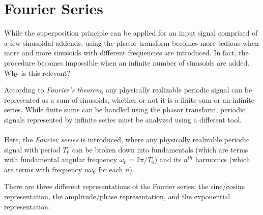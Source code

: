 \documentclass{report}
\begin{document}
\section{Fourier Series}
While the superposition principle can be applied for an input signal comprised of a few sinusoidal addends, using the phasor transform becomes more tedious when more and more sinusoids with different frequencies are introduced. 
In fact, the procedure becomes impossible when an infinite number of sinusoids are added. Why is this relevant?
\begin{tcolorbox}[width=\textwidth,colback={white}, sharp corners]
    According to \emph{Fourier's theorem}, any physically realizable periodic signal can be represented as a sum of sinusoids, whether or not it is a finite sum or an infinite series. While finite sums can be handled using the phasor transform, periodic signals represented by 
    infinite series must be analyzed using a different tool. 
    \\ \\ 
    Here, the \emph{Fourier series} is introduced, where any physically realizable periodic signal with period $T_0$ can be broken down into fundamentals (which are terms with fundamental angular frequency $\omega_0=2\pi/T_0$) and its $n^{th}$ harmonics 
    (which are terms with frequency $n\omega_0$ for each $n$).
\end{tcolorbox}
There are three different representations of the Fourier series: the sine/cosine representation, the amplitude/phase representation, and the exponential representation.
\end{document}

